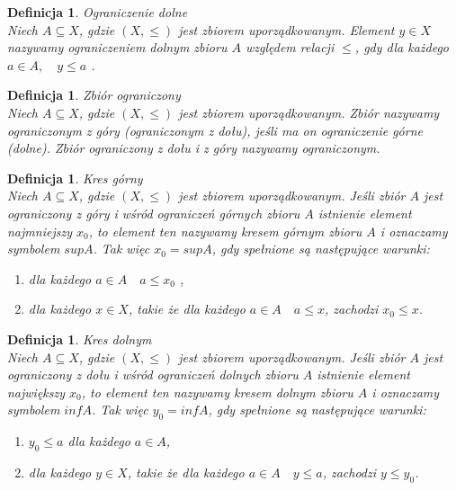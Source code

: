 \documentclass[12pt,a4paper]{report}
\newtheorem{definition}[theorem]{Definicja}
\begin{document}
\begin{definition}{Ograniczenie dolne \cite[Rozdział 2]{blaszczyk2007}}\\
Niech $A \subseteq X$, gdzie $(X, \leq)$ jest zbiorem uporządkowanym. Element $y \in X$ nazywamy ograniczeniem dolnym zbioru $A$ względem relacji $\leq$, gdy dla każdego $a \in A, \quad y \leq a$ . 
\end{definition}


\begin{definition}{Zbiór ograniczony \cite[Rozdział 2]{blaszczyk2007}}\\
Niech $A \subseteq X$, gdzie $(X, \leq)$ jest zbiorem uporządkowanym. Zbiór nazywamy ograniczonym z góry (ograniczonym z dołu), jeśli ma on ograniczenie górne (dolne). Zbiór ograniczony z dołu i z góry nazywamy ograniczonym. 
\end{definition}


\begin{definition}{Kres górny \cite[Rozdział 2]{blaszczyk2007}}\\
Niech $A \subseteq X$, gdzie $(X, \leq)$ jest zbiorem uporządkowanym. Jeśli zbiór $A$ jest ograniczony z góry i wśród ograniczeń górnych zbioru $A$ istnienie element najmniejszy $x_0$, to element ten nazywamy kresem górnym zbioru $A$ i oznaczamy symbolem $sup A$. Tak więc $x_0 =sup A$, gdy spełnione są następujące warunki:
\begin{enumerate}
\item dla każdego $a \in A \quad a \leq x_0$ ,
\item dla każdego $x \in X$, takie że dla każdego $a \in A \quad a \leq x$, zachodzi $x_0 \leq x$.
\end{enumerate}
\end{definition}


\begin{definition}{Kres dolnym \cite[Rozdział 2]{blaszczyk2007}}\\
Niech $A \subseteq X$, gdzie $(X, \leq)$ jest zbiorem uporządkowanym. Jeśli zbiór $A$ jest ograniczony z dołu i wśród ograniczeń dolnych zbioru $A$ istnienie element największy $x_0$, to element ten nazywamy kresem dolnym zbioru $A$ i oznaczamy symbolem $inf A$. Tak więc $y_0 =inf A$, gdy spełnione są następujące warunki:
\begin{enumerate}
\item $y_0 \leq a$ dla każdego $a \in A$,
\item dla każdego $y \in X$, takie że dla każdego $a \in A \quad y \leq a$, zachodzi $y \leq y_0$.
\end{enumerate}
\end{definition}
\end{document}
